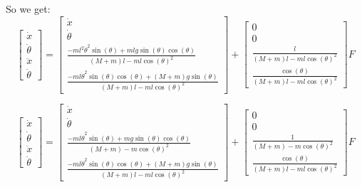 \documentclass[12pt,letterpaper]{article}
\begin{document}
    So we get:
    \begin{equation*}
        \begin{bmatrix}
            \dot x \\ \dot\theta \\ \ddot x \\ \ddot \theta 
        \end{bmatrix}
        =
        \begin{bmatrix}
            \dot x \\ \dot\theta 
            \\ \frac{-ml^2 \dot\theta^2\sin(\theta) + mlg\sin(\theta)\cos(\theta)}{(M+m)l - ml\cos(\theta)^2} 
            \\ \frac{-ml\dot\theta^2\sin(\theta)\cos(\theta) + (M+m)g\sin(\theta)}{(M+m)l - ml\cos(\theta)^2} 
        \end{bmatrix}
        +
        \begin{bmatrix}
            0 \\ 0 
            \\ \frac{l}{(M+m)l - ml\cos(\theta)^2} 
            \\ \frac{\cos(\theta)}{(M+m)l - ml\cos(\theta)^2} 
        \end{bmatrix}
        F
    \end{equation*}
    
    \begin{equation*}
        \begin{bmatrix}
            \dot x \\ \dot\theta \\ \ddot x \\ \ddot \theta 
        \end{bmatrix}
        =
        \begin{bmatrix}
            \dot x \\ \dot\theta 
            \\ \frac{-ml \dot\theta^2\sin(\theta) + mg\sin(\theta)\cos(\theta)}{(M+m) - m\cos(\theta)^2} 
            \\ \frac{-ml\dot\theta^2\sin(\theta)\cos(\theta) + (M+m)g\sin(\theta)}{(M+m)l - ml\cos(\theta)^2} 
        \end{bmatrix}
        +
        \begin{bmatrix}
            0 \\ 0 
            \\ \frac{1}{(M+m) - m\cos(\theta)^2} 
            \\ \frac{\cos(\theta)}{(M+m)l - ml\cos(\theta)^2} 
        \end{bmatrix}
        F
    \end{equation*}
    
\end{document}
